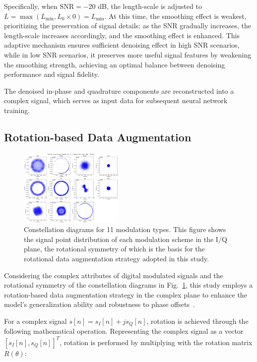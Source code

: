 \documentclass[conference]{IEEEtran}
\begin{document}
Specifically, when $\mathrm{SNR}=-20$ dB, the length-scale is adjusted to $L=\max(L_{\min}, L_0 \times 0)=L_{\min}$. At this time, the smoothing effect is weakest, prioritizing the preservation of signal details; as the SNR gradually increases, the length-scale increases accordingly, and the smoothing effect is enhanced. This adaptive mechanism ensures sufficient denoising effect in high SNR scenarios, while in low SNR scenarios, it preserves more useful signal features by weakening the smoothing strength, achieving an optimal balance between denoising performance and signal fidelity.

The denoised in-phase and quadrature components are reconstructed into a complex signal, which serves as input data for subsequent neural network training.

\subsection{Rotation-based Data Augmentation}

\begin{figure}[htbp]
\centering
\includegraphics[width=0.45\textwidth]{figure/constellation.png}
\caption{Constellation diagrams for 11 modulation types. This figure shows the signal point distribution of each modulation scheme in the I/Q plane, the rotational symmetry of which is the basis for the rotational data augmentation strategy adopted in this study.}
\label{fig:constellation}
\end{figure}

Considering the complex attributes of digital modulated signals and the rotational symmetry of the constellation diagrams in Fig.~\ref{fig:constellation}, this study employs a rotation-based data augmentation strategy in the complex plane to enhance the model's generalization ability and robustness to phase offsets~\cite{guo2024ulcnn}.

For a complex signal \(s[n] = s_I[n] + j s_Q[n]\), rotation is achieved through the following mathematical operation. Representing the complex signal as a vector \([s_I[n], s_Q[n]]^T\), rotation is performed by multiplying with the rotation matrix \(R(\theta)\):
\end{document}
